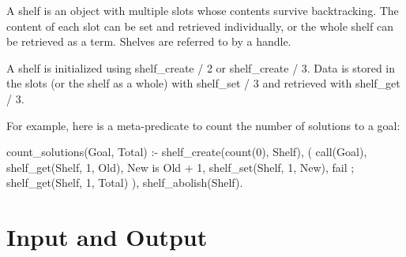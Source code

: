 A shelf is an object with multiple slots whose contents survive
backtracking. The content of each slot can be set and retrieved
individually, or the whole shelf can be retrieved 
as a term. Shelves are referred to by a handle.

A shelf is initialized using shelf_create / 2 or shelf_create /
3. Data is stored in the slots (or the shelf as a whole) with
shelf_set / 3 and retrieved with shelf_get / 3.  

For example, here is a meta-predicate to count the number of solutions
to a goal: 
\begin{code}
count_solutions(Goal, Total) :-
    shelf_create(count(0), Shelf),
    (
        call(Goal),
        shelf_get(Shelf, 1, Old),
        New is Old + 1,
        shelf_set(Shelf, 1, New),
        fail
    ;
        shelf_get(Shelf, 1, Total)
    ),
    shelf_abolish(Shelf).
\end{code}




\section{Input and Output}

